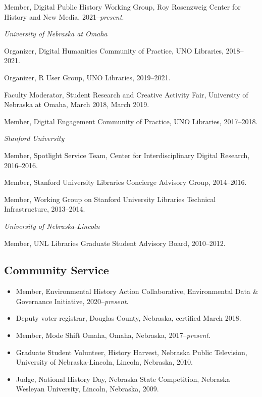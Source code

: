 \documentclass[10pt]{article}
\begin{document}
Member, Digital Public History Working Group, Roy Rosenzweig Center for History and New Media, 2021--\textit{present}.

\vspace{.4cm}

\textit{University of Nebraska at Omaha}

Organizer, Digital Humanities Community of Practice, UNO Libraries, 2018--2021.

Organizer, R User Group, UNO Libraries, 2019--2021.

Faculty Moderator, Student Research and Creative Activity Fair, University of
Nebraska at Omaha, March 2018, March 2019.

Member, Digital Engagement Community of Practice, UNO Libraries, 2017--2018.

\vspace{.4cm}

\textit{Stanford University}

Member, Spotlight Service Team, Center for Interdisciplinary Digital Research, 2016--2016.

Member, Stanford University Libraries Concierge Advisory Group, 2014--2016.

Member, Working Group on Stanford University Libraries Technical Infrastructure, 2013--2014.

\vspace{.4cm}

\textit{University of Nebraska-Lincoln}

Member, UNL Libraries Graduate Student Advisory Board, 2010--2012.

\subsection{Community Service}

\begin{itemize}
  \item Member, Environmental History Action Collaborative, Environmental Data \& Governance Initiative, 2020--\textit{present}.
  
  \item Deputy voter registrar, Douglas County, Nebraska, certified March 2018.
  
  \item Member, Mode Shift Omaha, Omaha, Nebraska, 2017--\textit{present}.
  
  \item Graduate Student Volunteer, History Harvest, Nebraska Public Television, University of Nebraska-Lincoln, Lincoln, Nebraska, 2010.
  
  \item Judge, National History Day, Nebraska State Competition, Nebraska Wesleyan University, Lincoln, Nebraska, 2009.
\end{itemize}
\end{document}
